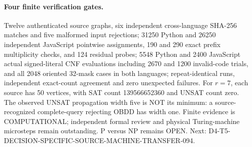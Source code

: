 \documentclass[11pt]{article}
\begin{document}
\paragraph{Four finite verification gates.}
Twelve authenticated source graphs, six independent cross-language
SHA-256 matches and five malformed input rejections;
31250 Python and 26250 independent JavaScript pointwise assignments,
190 and 290 exact prefix multiplicity checks, and 124 residual probes;
5548 Python and 2400 JavaScript actual signed-literal CNF evaluations
including 2670 and 1200 invalid-code trials, and all 2048 oriented
32-mask cases in both languages; repeat-identical runs,
independent exact-count agreement and zero unexpected failures.
For $r=7$, each source has 50 vertices, with SAT count
139566652360 and UNSAT count zero. The observed UNSAT
propagation width five is NOT its minimum: a source-recognized
complete-query rejecting OBDD has width one.
Finite evidence is COMPUTATIONAL; independent formal review and
physical Turing-machine microsteps remain outstanding.
P versus NP remains OPEN.
Next: D4-T5-DECISION-SPECIFIC-SOURCE-MACHINE-TRANSFER-094.


\end{document}
